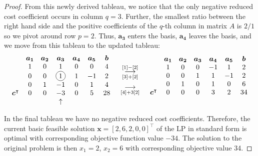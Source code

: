 \documentclass[12pt]{article}
\newcommand*\circled[1]{\tikz[baseline=(char.base)]{
            \node[shape=circle,draw,inner sep=2pt] (char) {#1};}}
\theoremstyle{definition}
\newcommand{\vect}[1]{\boldsymbol{#1}}
\newcommand{\grstep}[2][\relax]{%
   \ensuremath{\mathrel{
       {\mathop{\longrightarrow}\limits^{#2\mathstrut}_{
                                     \begin{subarray}{l} #1 \end{subarray}}}}}}
\begin{document}
\begin{proof}
  From this newly derived tableau, we notice that the only negative reduced cost coefficient
  occurs in column $q=3$. Further, the smallest ratio between the right hand side
  and the positive coefficients of the $q$-th column in matrix $A$ is $2/1$ so we pivot
  around row $p=2$. Thus, $\vect{a_3}$ enters the basis, $\vect{a_4}$ leaves the basis, and we move from this tableau to the updated tableau:
  \begin{align*}
    \begin{matrix}
      & \vect{a_1} & \vect{a_2} & \vect{a_3} & \vect{a_4} & \vect{a_5} & \vect{b} \\
                       & 1 & 0 & 1 & 0 & 0 & 4 \\
                       & 0 & 0 & \circled{1} & 1 & -1 & 2 \\
                       & 0 & 1 & -1 & 0 & 1 & 4 \\
      \vect{c}^\intercal & 0 & 0 & -3 & 0 & 5 & 28 \\
      & & & \uparrow & & & \\
    \end{matrix}
    \quad
    \begin{array}{c}
    \grstep[{[3] + [2]}]{[1] - [2]} \\
    \grstep[{[4] + 3[2]}]{} \\
    \end{array}
    \quad
    \begin{matrix}
      & \vect{a_1} & \vect{a_2} & \vect{a_3} & \vect{a_4} & \vect{a_5} & \vect{b} \\
                       & 1 & 0 & 0 & -1 & 1 & 2 \\
                       & 0 & 0 & 1 & 1 & -1 & 2 \\
                       & 0 & 1 & 0 & 1 & 0 & 6 \\
      \vect{c}^\intercal & 0 & 0 & 0 & 3 & 2 & 34 \\
      & & & & & & \\
    \end{matrix}
  \end{align*}

  In the final tableau we have no negative reduced cost coefficients. Therefore,
  the current basic feasible solution $\vect{x} = [2, 6, 2, 0, 0]^\intercal$ of the LP in
  standard form is optimal with corresponding
  objective function value $-34$. The solution to the original problem is then
  $x_1 = 2$, $x_2 = 6$ with corresponding objective value 34.
\end{proof}
\newpage
\end{document}
